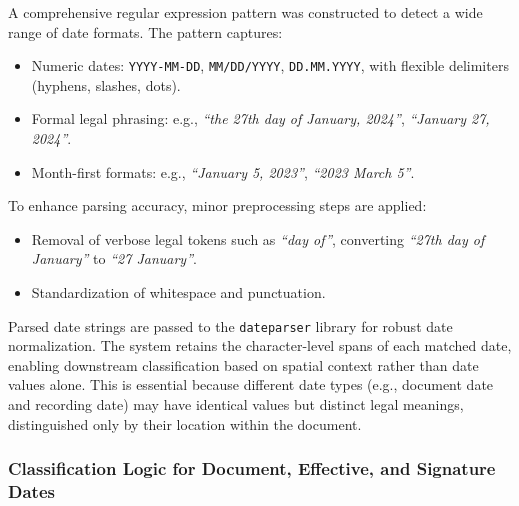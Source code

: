 \documentclass{article}
\begin{document}
A comprehensive regular expression pattern was constructed to detect a wide range of date formats. The pattern captures:
\begin{itemize}
    \item Numeric dates: \texttt{YYYY-MM-DD}, \texttt{MM/DD/YYYY}, \texttt{DD.MM.YYYY}, with flexible delimiters (hyphens, slashes, dots).
    \item Formal legal phrasing: e.g., \textit{``the 27th day of January, 2024''}, \textit{``January 27, 2024''}.
    \item Month-first formats: e.g., \textit{``January 5, 2023''}, \textit{``2023 March 5''}.
\end{itemize}

To enhance parsing accuracy, minor preprocessing steps are applied:
\begin{itemize}
    \item Removal of verbose legal tokens such as \textit{``day of''}, converting \textit{``27th day of January''} to \textit{``27 January''}.
    \item Standardization of whitespace and punctuation.
\end{itemize}

Parsed date strings are passed to the \texttt{dateparser} library for robust date normalization. \cite{dateparser} The system retains the character-level spans of each matched date, enabling downstream classification based on spatial context rather than date values alone. This is essential because different date types (e.g., document date and recording date) may have identical values but distinct legal meanings, distinguished only by their location within the document.

\subsubsection{Classification Logic for Document, Effective, and Signature Dates}
\end{document}
